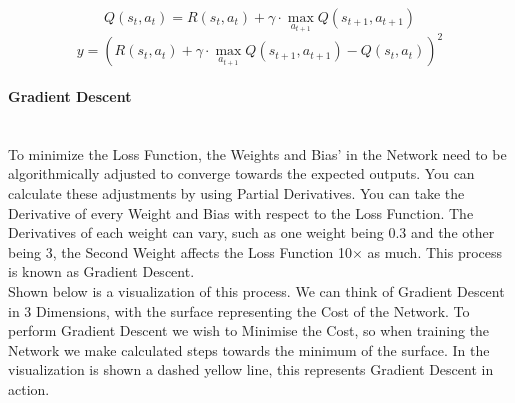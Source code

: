 \begin{flushleft}
                    \[Q(s_t, a_t) = R(s_t, a_t) + \gamma \cdot \max_{a_{t+1}} Q(s_{t+1}, a_{t+1})\]
                    \[y = \left( R(s_t, a_t) + \gamma \cdot \max_{a_{t+1}} Q(s_{t+1}, a_{t+1}) - Q(s_t, a_t) \right)^2\]

                \paragraph{Gradient Descent} \mbox{} \\ 
                    To minimize the Loss Function, the Weights and Bias' in the Network need to be algorithmically adjusted to converge towards the expected outputs. You can
                    calculate these adjustments by using Partial Derivatives. You can take the Derivative of every Weight and Bias with respect to the Loss Function. The Derivatives
                    of each weight can vary, such as one weight being 0.3 and the other being 3, the Second Weight affects the Loss Function 10$\times$ as much. This process is
                    known as Gradient Descent. \\
                    \vspace{0.2cm}
                    Shown below is a visualization of this process. We can think of Gradient Descent in 3 Dimensions, with the surface representing the Cost of the 
                    Network. To perform Gradient Descent we wish to Minimise the Cost, so when training the Network we make calculated steps towards the 
                    minimum of the surface. In the visualization is shown a dashed yellow line, this represents Gradient Descent in action.


\end{flushleft}
